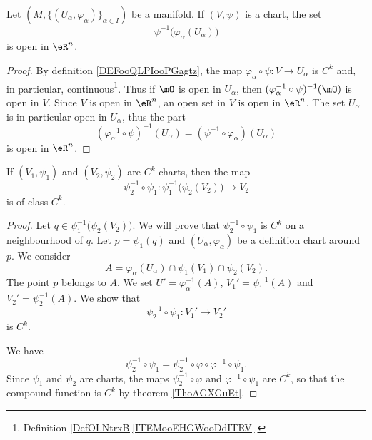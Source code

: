 \begin{lemma}       \label{LEMooGAMVooIWUzmy}
	Let \( (M,\{ (U_{\alpha}, \varphi_{\alpha}) \}_{\alpha\in I}) \) be a manifold. If \( (V,\psi)\) is a chart, the set
	\begin{equation}
		\psi^{-1}\big(\varphi_{\alpha}(U_{\alpha})\big)
	\end{equation}
	is open in \(\eR^n\).
\end{lemma}

\begin{proof}
	By definition \ref{DEFooQLPIooPGagtz}, the map \( \varphi_{\alpha}\circ \psi \colon V\to U_{\alpha}\) is \( C^k\) and, in particular, continuous\footnote{Definition \ref{DefOLNtrxB}\ref{ITEMooEHGWooDdITRV}.}. Thus if \( \mO\) is open in \( U_{\alpha}\), then \( (\varphi_{\alpha}^{-1}\circ\psi)^{-1}(\mO)\) is open in \( V\). Since \( V\) is open in \( \eR^n\), an open set in \( V\) is open in \( \eR^n\). The set \( U_{\alpha}\) is in particular open in \( U_{\alpha}\), thus the part
	\begin{equation}
		(\varphi_{\alpha}^{-1}\circ \psi)^{-1}(U_{\alpha})=(\psi^{-1}\circ\varphi_{\alpha})(U_{\alpha})
	\end{equation}
	is open in \( \eR^n\).
\end{proof}

\begin{proposition}      \label{PROPooUDVFooEJeluM}
	If \( (V_1,\psi_1)\) and \( (V_2,\psi_2)\) are \( C^k\)-charts, then the map
	\begin{equation}
		\psi_2^{-1}\circ \psi_1\colon \psi_1^{-1}\big( \psi_2(V_2) \big)\to V_2
	\end{equation}
	is of class \( C^k\).
\end{proposition}

\begin{proof}
	Let \( q\in \psi_1^{-1}\big( \psi_2(V_2) \big)\). We will prove that \( \psi_2^{-1}\circ\psi_1\) is \( C^k\) on a neighbourhood of \( q\).  Let \( p=\psi_1(q)\) and \( (U_{\alpha},\varphi_{\alpha})\) be a definition chart around \( p\). We consider
	\begin{equation}
		A=\varphi_{\alpha}(U_{\alpha})\cap\psi_1(V_1)\cap\psi_2(V_2).
	\end{equation}
	The point \( p\) belongs to \( A\). We set \( U'=\varphi_{\alpha}^{-1}(A)\), \( V_1'=\psi_1^{-1}(A)\) and \( V_2'=\psi_2^{-1}(A)\). We show that
	\begin{equation}
		\psi_2^{-1}\circ\psi_1\colon V_1'\to V_2'
	\end{equation}
	is \( C^k\).

	We have
	\begin{equation}
		\psi_2^{-1}\circ\psi_1=\psi_2^{-1}\circ\varphi\circ\varphi^{-1}\circ\psi_1.
	\end{equation}
	Since \( \psi_1\) and \( \psi_2\) are charts, the maps \( \psi_2^{-1}\circ \varphi\) and \( \varphi^{-1}\circ\psi_1\) are \( C^k\), so that the compound function is \( C^k\) by theorem \ref{ThoAGXGuEt}.
\end{proof}

